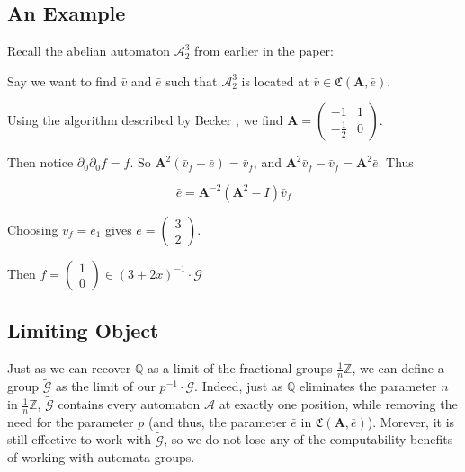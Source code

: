 \documentclass[runningheads]{llncs}
\newcommand{\A}{\mathcal{A}}
\newcommand{\G}{\mathcal{G}}
\newcommand{\C}{\mathfrak{C}(\Am,\e)}
\newcommand{\Z}{\mathbb{Z}}
\newcommand{\Q}{\mathbb{Q}}
\newcommand{\2}{\textbf{2}}
\newcommand{\Am}{\textbf{A}}
\newcommand{\del}{\partial}
\newcommand{\vv}{\bar{v}}
\newcommand{\e}{\bar{e}}
\begin{document}
\subsection{An Example}
Recall the abelian automaton $\A^3_2$ from earlier in the paper:

\begin{center}
\end{center}

Say we want to find $\vv$ and $\e$ such that $\A^3_2$ is located at 
$\vv \in \C$.

Using the algorithm described by Becker \cite{Becker18:thesis}, we find
$\Am = \begin{pmatrix} -1 & 1 \\ -\frac{1}{2} & 0 \end{pmatrix}$.

Then notice $\del_0 \del_0 f = f$.
So $\Am^2 (\vv_f - \e) = \vv_f$, and
$\Am^2 \vv_f - \vv_f = \Am^2 \e$. Thus

\[ \e = \Am^{-2} (\Am^2 - I) \vv_f \]

Choosing $\vv_f = \e_1$ gives $\e = \begin{pmatrix} 3 \\ 2 \end{pmatrix}$.

Then $f = \begin{pmatrix} 1 \\ 0 \end{pmatrix} \in (3+2x)^{-1} \cdot \G$

\subsection{Limiting Object}
Just as we can recover $\Q$ as a limit of the fractional groups 
$\frac{1}{n} \Z$, we can define a group $\widetilde{\G}$ as the limit of
our $p^{-1} \cdot \G$. Indeed, just as
$\Q$ eliminates the parameter $n$ in $\frac{1}{n} \Z$, $\widetilde{\G}$ 
contains every automaton $\A$ at exactly one position, while removing the need
for the parameter $p$ (and thus, the parameter $\e$ in $\C$). Morever, it is
still effective to work with $\widetilde{\G}$, so we do not lose any of the
computability benefits of working with automata groups.
\end{document}
